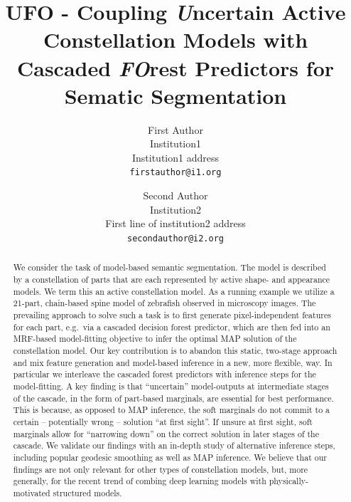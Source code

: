 \documentclass[10pt,twocolumn,letterpaper]{article}
\begin{document}
\title{UFO - Coupling \textit{U}ncertain Active Constellation Models with \\
Cascaded \textit{FO}rest Predictors for Sematic Segmentation}

\author{First Author\\
Institution1\\
Institution1 address\\
{\tt\small firstauthor@i1.org}
\and
Second Author\\
Institution2\\
First line of institution2 address\\
{\tt\small secondauthor@i2.org}
}

\maketitle

\begin{abstract}
We consider the task of model-based semantic segmentation. The model is described by a constellation of parts that are each represented by active shape- and appearance models. We term this an active constellation model. As a running example we utilize a 21-part, chain-based spine model of zebrafish observed in microscopy images. The prevailing approach to solve such a task is to first generate pixel-independent features for each part, e.g.\ via a cascaded decision forest predictor, which are then fed into an MRF-based model-fitting objective to infer the optimal MAP solution of the constellation model. Our key contribution is to abandon this static, two-stage approach and mix feature generation and model-based inference in a new, more flexible, way. In particular we interleave the cascaded forest predictors with inference steps for the model-fitting. A key finding is that “uncertain” model-outputs at intermediate stages of the cascade, in the form of part-based marginals, are essential for best performance. 
%
This is because, as opposed to MAP inference, the soft marginals do not commit to a certain -- potentially wrong -- solution ``at first sight''. If unsure at first sight, soft marginals allow for ``narrowing down'' on the correct solution in later stages of the cascade. 
%
We validate our findings with an in-depth study of alternative inference steps, including popular geodesic smoothing as well as MAP inference. %
We believe that our findings are not only relevant for other types of constellation models, but, more generally, for the recent trend of combing deep learning models with physically-motivated structured models. 
\end{abstract}
\end{document}
